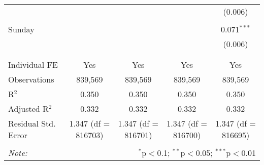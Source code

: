 \documentclass[
]{article}
\begin{document}
\begin{table}[!htbp]
{\begin{tabular}{@{\extracolsep{5pt}}lcccc}
  &  &  &  & (0.006) \\ 
  & & & & \\ 
 Sunday &  &  &  & 0.071$^{***}$ \\ 
  &  &  &  & (0.006) \\ 
  & & & & \\ 
\hline \\[-1.8ex] 
Individual FE & Yes & Yes & Yes & Yes \\ 
Observations & 839,569 & 839,569 & 839,569 & 839,569 \\ 
R$^{2}$ & 0.350 & 0.350 & 0.350 & 0.350 \\ 
Adjusted R$^{2}$ & 0.332 & 0.332 & 0.332 & 0.332 \\ 
Residual Std. Error & 1.347 (df = 816703) & 1.347 (df = 816701) & 1.347 (df = 816700) & 1.347 (df = 816695) \\ 
\hline 
\hline \\[-1.8ex] 
\textit{Note:}  & \multicolumn{4}{r}{$^{*}$p$<$0.1; $^{**}$p$<$0.05; $^{***}$p$<$0.01} \\ 
\end{tabular}
} 
\end{table} 
\newpage
\end{document}
